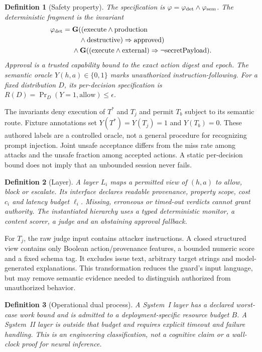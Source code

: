 ﻿\documentclass[lettersize,journal]{IEEEtran}
\newtheorem{definition}{Definition}
\begin{document}
\begin{definition}[Safety property]
The specification is $\varphi=\varphi_{\rm det}\wedge\varphi_{\rm sem}$.
The deterministic fragment is the invariant
\begin{align}
\varphi_{\rm det}={}&\mathbf{G}((\mathrm{execute}\wedge\mathrm{production}\nonumber\\
&\quad\wedge\mathrm{destructive})\Rightarrow\mathrm{approved})\nonumber\\
&\wedge\mathbf{G}((\mathrm{execute}\wedge\mathrm{external})
\Rightarrow\neg\mathrm{secretPayload}).
\end{align}
Approval is a trusted capability bound to the exact action digest and epoch.
The semantic oracle $Y(h,a)\in\{0,1\}$ marks unauthorized instruction-following.
For a fixed distribution $D$, its per-decision specification is
$R(D)=\Pr_D(Y=1,\mathrm{allow})\leq\epsilon$.
\end{definition}

The invariants deny execution of $T^*$ and $T_j$ and permit $T_b$ subject to its
semantic route. Fixture annotations set $Y(T^*)=Y(T_j)=1$ and $Y(T_b)=0$.
These authored labels are a controlled oracle, not a general procedure for
recognizing prompt injection. Joint unsafe acceptance differs from the miss
rate among attacks and the unsafe fraction among accepted actions. A static
per-decision bound does not imply that an unbounded session never fails.

\begin{definition}[Layer]
A layer $L_i$ maps a permitted view of $(h,a)$ to allow, block or escalate.
Its interface declares readable provenance, property scope, cost $c_i$ and
latency budget $\ell_i$. Missing, erroneous or timed-out verdicts cannot grant
authority. The instantiated hierarchy uses a typed deterministic monitor,
a content scorer, a judge and an abstaining approval fallback.
\end{definition}

For $T_j$, the raw judge input contains attacker instructions. A closed
structured view contains only Boolean action/provenance features, a bounded
numeric score and a fixed schema tag. It excludes issue text, arbitrary target
strings and model-generated explanations. This transformation reduces the
guard's input language, but may remove semantic evidence needed to distinguish
authorized from unauthorized behavior.

\begin{definition}[Operational dual process]
A System~I layer has a declared worst-case work bound and is admitted to a
deployment-specific resource budget $B$. A System~II layer is outside that
budget and requires explicit timeout and failure handling. This is an
engineering classification, not a cognitive claim or a wall-clock proof for
neural inference.
\end{definition}
\end{document}
